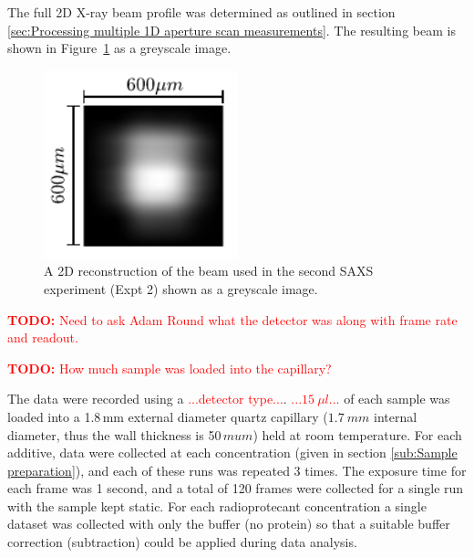 The full 2D X-ray beam profile was determined as outlined in section \ref{sec:Processing multiple 1D aperture scan measurements}. The resulting beam is shown in Figure~\ref{fig:SAXS beam profile} as a greyscale image.
\begin{figure}
    \centering
    \includegraphics[width=0.5\textwidth]{figures/saxs/SAXS_beam.pdf}
    \caption{A 2D reconstruction of the beam used in the second SAXS experiment (Expt 2) shown as a greyscale image.}
    \label{fig:SAXS beam profile}
\end{figure}

\textcolor{red}{
    \begin{myenumerate}
        \item \hypertarget{todo:Detector type}{\textbf{TODO:} Need to ask Adam Round what the detector was along with frame rate and readout.}
        \item \hypertarget{todo:Detector type}{\textbf{TODO:} How much sample was loaded into the capillary?}
    \end{myenumerate}
}
The data were recorded using a \textcolor{red}{...detector type...}.
\textcolor{red}{...$15\ \mu l$...} of each sample was loaded into a 1.8$\,$mm external diameter quartz capillary ($1.7\ mm$ internal diameter, thus the wall thickness is 50$\,mu m$) held at room temperature.
For each additive, data were collected at each concentration (given in section \ref{sub:Sample preparation}), and each of these runs was repeated 3 times.
The exposure time for each frame was 1 second, and a total of 120 frames were collected for a single run with the sample kept static.
For each radioprotecant concentration a single dataset was collected with only the buffer (no protein) so that a suitable buffer correction (subtraction) could be applied during data analysis.

